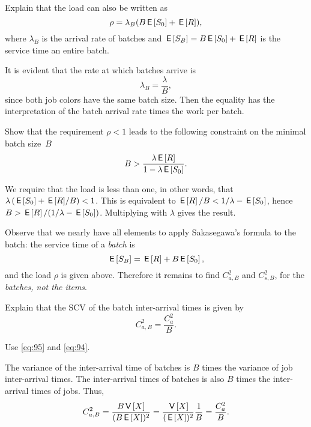 \begin{exercise}
Explain that the load can also be written as
\begin{equation*}
\rho = \lambda_B (B \,\mathsf{E}\left[S_0\right] + \,\mathsf{E}\left[R\right]),
\end{equation*}
where $\lambda_B$ is the arrival rate of batches and $\,\mathsf{E}\left[S_B\right] = B \,\mathsf{E}\left[S_0\right] + \,\mathsf{E}\left[R\right]$ is the service time an entire batch.
\begin{solution}
It is evident that the rate at which batches arrive is 
\begin{equation*}
 \lambda_B = \frac \lambda B,
\end{equation*}
since both job colors have the same batch size. 
Then the equality has the interpretation of the batch arrival rate times the work per batch.
\end{solution}
\end{exercise}

\begin{exercise}
Show that the requirement $\rho < 1$ leads to the following constraint on the minimal batch size~$B$ 
 \begin{equation*}
 B>\frac{\lambda \,\mathsf{E}\left[R\right]}{1-\lambda \,\mathsf{E}\left[S_0\right]}.
 \end{equation*}
\begin{solution}
 We require that the load is less than one, in other words, that $\lambda\left(\,\mathsf{E}\left[S_0\right] + {\,\mathsf{E}\left[R\right]}/B\right) < 1$. This is equivalent to $\,\mathsf{E}\left[R\right]/B < 1/\lambda - \,\mathsf{E}\left[S_0\right]$, hence $B > \,\mathsf{E}\left[R\right]/(1/\lambda - \,\mathsf{E}\left[S_0\right])$. Multiplying with $\lambda$ gives the result. 
\end{solution}
\end{exercise}

Observe that we nearly have all elements to apply Sakasegawa's formula to the batch: the service time of a \emph{batch} is
\begin{equation}
  \label{eq:90}
\,\mathsf{E}\left[S_B\right] = \,\mathsf{E}\left[R\right] + B\,\mathsf{E}\left[S_0\right],
\end{equation}
and the load $\rho$ is given above.
Therefore it remains to find $C_{a,B}^2$ and $C_{s,B}^2$, for the \emph{batches, not the items}.

\begin{exercise}
Explain that the SCV of the batch inter-arrival times is given by
 \begin{equation}\label{eq:82}
C_{a,B}^2 = \frac{C_{a}^2}B.
\end{equation}
\begin{hint}
Use \cref{eq:95} and \cref{eq:94}.
\end{hint}
\begin{solution}
The variance of the inter-arrival time of batches is $B$ times the variance of job inter-arrival times. The inter-arrival times of batches is also $B$ times the inter-arrival times of jobs. Thus, 
\begin{equation*}
 C_{a,B}^2 = \frac{B \,\mathsf{V}\left[X\right]}{(B \,\mathsf{E}\left[X\right])^2} = \frac{\,\mathsf{V}\left[X\right]}{(\,\mathsf{E}\left[X\right])^2} \frac 1 B = \frac{C_a^2}{B}.
\end{equation*}
\end{solution}
\end{exercise}


